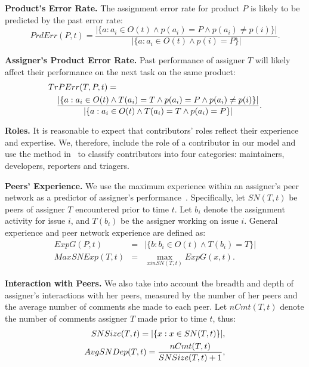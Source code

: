 \documentclass{sig-alternate}
\begin{document}
{\bf Product's Error Rate.}
The assignment error rate for product $P$ is likely to be predicted by the past error rate:
\begin{equation}
PrdErr(P,t)=\frac{|\{a:a_i \in O(t) \land p(a_i)=P \land p(a_i)\ne
  p(i)\}|}{|\{a:a_i \in O(t) \land p(i)=P\}|}.\label{eq:PErr}
\end{equation}

{\bf Assigner's Product Error Rate.}
Past performance of assigner $T$ will likely affect
their performance on the next task on the same product:\\
\vspace{-.5cm}
\begin{eqnarray}
\lefteqn{TrPErr(T,P,t)=}&& \label{eq:TrPErr}\\
&&\frac{|\{a:a_i\in O(t) \land T(a_i)=T \land p(a_i)=P \land p(a_i)\ne p(i)\}|}{|\{a:a_i \in O(t) \land T(a_i)=T \land p(a_i)=P\}|}.\nonumber
\vspace{-.35cm}
\end{eqnarray}

{\bf Roles.}\label{ss:roles}
It is reasonable to expect that
contributors' roles reflect their experience and expertise.
We, therefore, include the role of a contributor in our
model and use the method in~\cite{XZM13} to classify
contributors into four categories: maintainers, developers,
reporters and triagers.

{\bf Peers' Experience.}
We use the maximum experience within an assigner's
peer network as a predictor of assigner's performance~\cite{MM12}.
Specifically, let $SN(T,t)$ be peers of
assigner $T$ encountered prior to time $t$. Let $b_i$ denote the
assignment activity for issue $i$, and $T(b_{i})$ be the assigner working
on issue $i$. General experience and peer network experience are
defined as:
\begin{eqnarray}
ExpG(P,t)&=&|\{b:b_i \in O(t) \land T(b_{i})=T\}|\\
MaxSNExp(T,t) &=& \max_{x in SN(T,t)}ExpG(x,t). \label{eq:MaxSNExp}
\end{eqnarray}

{\bf Interaction with Peers.}
We also take into account the
breadth and depth of assigner’s interactions with her peers,
measured by the number of her peers and the average number of
comments she made to each peer. Let $nCmt(T, t)$ denote the number of
comments assigner $T$ made prior to time $t$, thus:
\begin{align}
\vspace{-.35cm}
SNSize(T,t) = |\{x:x\in SN(T,t)\}|,\label{eq:SNSize}\\
AvgSNDep(T,t) = \frac{nCmt(T,t)}{SNSize(T,t)+1}, \label{eq:AvgSNDep}
\vspace{-.35cm}
\end{align}
\end{document}
